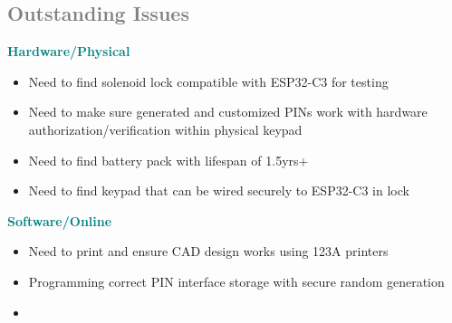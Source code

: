 \subsection{\textcolor{gray}{Outstanding Issues}}
\textcolor{teal}{\textbf{Hardware/Physical}}
\begin{itemize}
    \item Need to find solenoid lock compatible with ESP32-C3 for testing
    \item Need to make sure generated and customized PINs work with hardware authorization/verification within physical keypad
     \item Need to find battery pack with lifespan of 1.5yrs+
     \item Need to find keypad that can be wired securely to ESP32-C3 in lock 
\end{itemize}
\textcolor{teal}{\textbf{Software/Online}}
\begin{itemize}
     \item Need to print and ensure CAD design works using 123A printers
     \item Programming correct PIN interface storage with secure random generation
     \item 
    
\end{itemize}